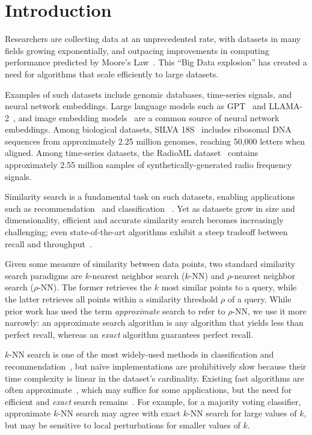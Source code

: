 \section{Introduction}
\label{sec:introduction}

Researchers are collecting data at an unprecedented rate, with datasets in many fields growing exponentially, and outpacing improvements in computing performance predicted by Moore's Law~\cite{kahn2011future}. This ``Big Data explosion'' has created a need for algorithms that scale efficiently to large datasets.

Examples of such datasets include genomic databases, time-series signals, and neural network embeddings.
Large language models such as GPT~\cite{2020arXiv200514165B, OpenAI2023GPT4TR} and LLAMA-2~\cite{Touvron2023Llama2O}, and image embedding models~\cite{radford2021learning, dosovitskiy2020image} are a common source of neural network embeddings.
Among biological datasets,  SILVA 18S~\cite{10.1093/nar/gks1219} includes ribosomal DNA sequences from approximately 2.25 million genomes, reaching 50,000 letters when aligned.
Among time-series datasets, the RadioML dataset~\cite{oshea2018radioml} contains approximately 2.55 million samples of synthetically-generated radio frequency signals.

Similarity search is a fundamental task on such datasets, enabling applications such as recommendation~\cite{annoy} and classification ~\cite{suyanto2022knnclassifier}.
Yet as datasets grow in size and dimensionality, efficient and accurate similarity search becomes increasingly challenging;
even state-of-the-art algorithms exhibit a steep tradeoff between recall and throughput~\cite{malkov2016hnsw, johnson2019billion, annoy, aumuller2020ann}.

Given some measure of similarity between data points, two standard similarity search paradigms are $k$-nearest neighbor search ($k$-NN) and $\rho$-nearest neighbor search ($\rho$-NN).
The former retrieves the $k$ most similar points to a query, while the latter retrieves all points within a similarity threshold $\rho$ of a query.
While prior work has used the term \textit{approximate} search to refer to $\rho$-NN, we use it more narrowly: an {approximate} search algorithm is any algorithm that yields less than perfect recall, whereas an \textit{exact} algorithm guarantees perfect recall.

$k$-NN search is one of the most widely-used methods in classification and recommendation~\cite{fix1952discriminatory, cover1967nearest}, but na\"{i}ve implementations are prohibitively slow because their time complexity is linear in the dataset's cardinality.
Existing fast algorithms are often approximate~\cite{gao2023high}, which may suffice for some applications, but the need for efficient and \textit{exact} search remains~\cite{ukey2023survey}.
For example, for a majority voting classifier, approximate $k$-NN search may agree with exact $k$-NN search for large values of $k$, but may be sensitive to local perturbations for smaller values of $k$.

